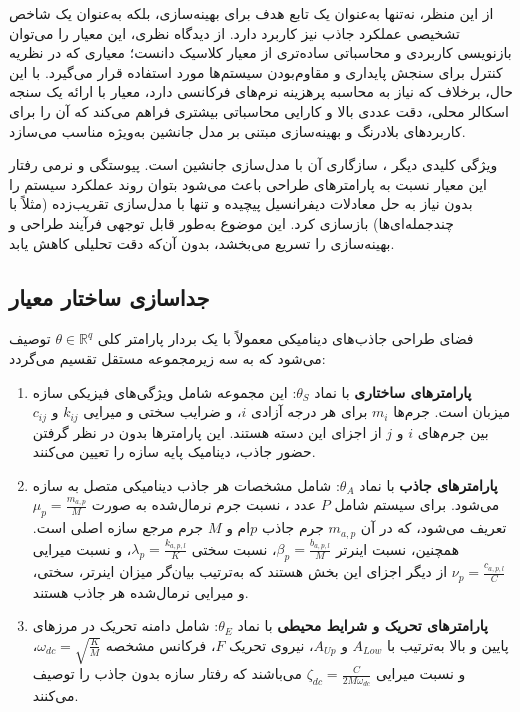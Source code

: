 از این منظر،  نه‌تنها به‌عنوان یک تابع هدف برای بهینه‌سازی، بلکه به‌عنوان یک شاخص تشخیصی عملکرد جاذب نیز کاربرد دارد. از دیدگاه نظری، این معیار را می‌توان بازنویسی کاربردی و محاسباتی ساده‌تری از معیار کلاسیک  دانست؛ معیاری که در نظریه کنترل برای سنجش پایداری و مقاوم‌بودن سیستم‌ها مورد استفاده قرار می‌گیرد. با این حال، برخلاف  که نیاز به محاسبه پرهزینه نرم‌های فرکانسی دارد، معیار  با ارائه یک سنجه اسکالر محلی، دقت عددی بالا و کارایی محاسباتی بیشتری فراهم می‌کند که آن را برای کاربردهای بلادرنگ و بهینه‌سازی مبتنی بر مدل جانشین به‌ویژه مناسب می‌سازد.

ویژگی کلیدی دیگر ، سازگاری آن با مدل‌سازی جانشین است. پیوستگی و نرمی رفتار این معیار نسبت به پارامترهای طراحی باعث می‌شود بتوان روند عملکرد سیستم را بدون نیاز به حل معادلات دیفرانسیل پیچیده و تنها با مدل‌سازی تقریب‌زده (مثلاً با چندجمله‌ای‌ها) بازسازی کرد. این موضوع به‌طور قابل توجهی فرآیند طراحی و بهینه‌سازی را تسریع می‌بخشد، بدون آن‌که دقت تحلیلی کاهش یابد.

\subsection{جداسازی ساختار معیار }

فضای طراحی جاذب‌های دینامیکی معمولاً با یک بردار پارامتر کلی $\theta \in \mathbb{R}^q$ توصیف می‌شود که به سه زیرمجموعه مستقل تقسیم می‌گردد:


\begin{enumerate}
  \item \textbf{پارامترهای ساختاری} با نماد $\theta_S$: این مجموعه شامل ویژگی‌های فیزیکی سازه میزبان است. جرم‌ها $m_i$ برای هر درجه آزادی $i$، و ضرایب سختی و میرایی $k_{ij}$ و $c_{ij}$ بین جرم‌های $i$ و $j$ از اجزای این دسته هستند. این پارامترها بدون در نظر گرفتن حضور جاذب، دینامیک پایه سازه را تعیین می‌کنند.

  \item \textbf{پارامترهای جاذب} با نماد $\theta_A$: شامل مشخصات هر جاذب دینامیکی متصل به سازه می‌شود. برای سیستم شامل $P$ عدد ، نسبت جرم نرمال‌شده به صورت $\mu_p = \frac{m_{a,p}}{M}$ تعریف می‌شود، که در آن $m_{a,p}$ جرم جاذب $p$ام و $M$ جرم مرجع سازه اصلی است. همچنین، نسبت اینرتر $\beta_p = \frac{b_{a,p,l}}{M}$، نسبت سختی $\lambda_p = \frac{k_{a,p,l}}{K}$، و نسبت میرایی $\nu_p = \frac{c_{a,p,l}}{C}$ از دیگر اجزای این بخش هستند که به‌ترتیب بیان‌گر میزان اینرتر، سختی، و میرایی نرمال‌شده هر جاذب هستند.

  \item \textbf{پارامترهای تحریک و شرایط محیطی} با نماد $\theta_E$: شامل دامنه تحریک در مرزهای پایین و بالا به‌ترتیب با $A_{Low}$ و $A_{Up}$، نیروی تحریک $F$، فرکانس مشخصه $\omega_{dc} = \sqrt{\frac{K}{M}}$، و نسبت میرایی $\zeta_{dc} = \frac{C}{2M\omega_{dc}}$ می‌باشند که رفتار سازه بدون جاذب را توصیف می‌کنند.
\end{enumerate}

